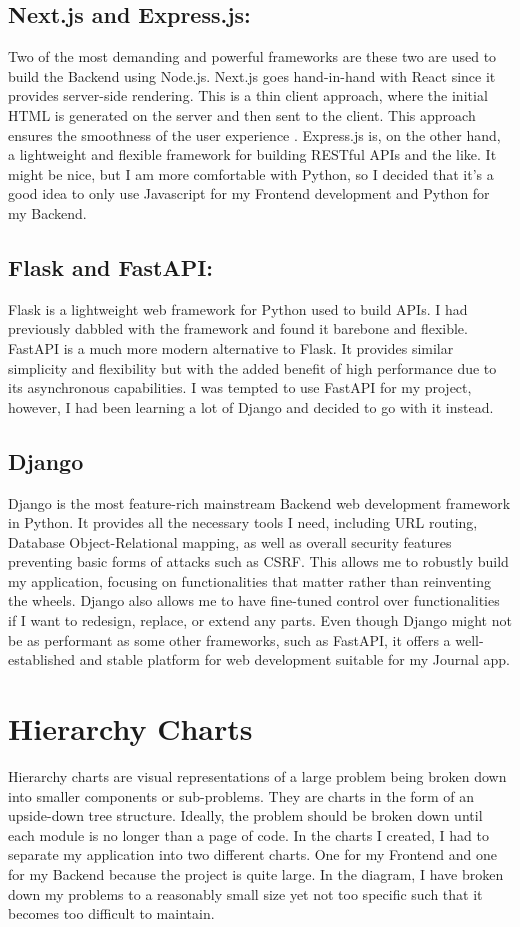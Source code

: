 \subsection{Next.js and Express.js:}
Two of the most demanding and powerful frameworks are these two are used to build the Backend using Node.js. Next.js goes hand-in-hand with React since it provides server-side rendering. This is a thin client approach, where the initial HTML is generated on the server and then sent to the client. This approach ensures the smoothness of the user experience \cite{gillis_2020_fat}. Express.js is, on the other hand, a lightweight and flexible framework for building RESTful APIs and the like. It might be nice, but I am more comfortable with Python, so I decided that it's a good idea to only use Javascript for my Frontend development and Python for my Backend.

\subsection{Flask and FastAPI:}
Flask is a lightweight web framework for Python used to build APIs. I had previously dabbled with the framework and found it barebone and flexible. FastAPI is a much more modern alternative to Flask. It provides similar simplicity and flexibility but with the added benefit of high performance due to its asynchronous capabilities. I was tempted to use FastAPI for my project, however, I had been learning a lot of Django and decided to go with it instead.

\subsection{Django}
Django is the most feature-rich mainstream Backend web development framework in Python. It provides all the necessary tools I need, including URL routing, Database Object-Relational mapping, as well as overall security features preventing basic forms of attacks such as CSRF. This allows me to robustly build my application, focusing on functionalities that matter rather than reinventing the wheels. Django also allows me to have fine-tuned control over functionalities if I want to redesign, replace, or extend any parts. Even though Django might not be as performant as some other frameworks, such as FastAPI, it offers a well-established and stable platform for web development suitable for my Journal app.

\section{Hierarchy Charts}
Hierarchy charts are visual representations of a large problem being broken down into smaller components or sub-problems. They are charts in the form of an upside-down tree structure. Ideally, the problem should be broken down until each module is no longer than a page of code. In the charts I created, I had to separate my application into two different charts. One for my Frontend and one for my Backend because the project is quite large. In the diagram, I have broken down my problems to a reasonably small size yet not too specific such that it becomes too difficult to maintain.


